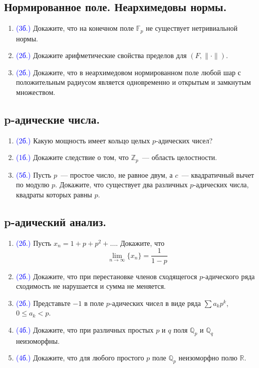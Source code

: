 \documentclass[11pt]{article}
\begin{document}
    \subsection*{Нормированное поле. Неархимедовы нормы.}
    \begin{enumerate}[start=1,label={\bfseries \arabic*.}]
        \item \textcolor{blue}{(3б.)} Докажите, что на конечном поле $\mathbb{F}_{p}$ не существует нетривиальной нормы.

        \item \textcolor{blue}{(2б.)} Докажите арифметические свойства пределов для $(F, \| \cdot \|)$.

        \item \textcolor{blue}{(2б.)} Докажите, что в неархимедовом нормированном поле любой шар с положительным радиусом является одновременно и открытым
              и замкнутым множеством.
    \end{enumerate}
    \subsection*{p-адические числа.}
    \begin{enumerate}[start=1,label={\bfseries \arabic*.}]
        \item \textcolor{blue}{(2б.)} Какую мощность имеет кольцо целых $p$-адических чисел?

        \item \textcolor{blue}{(1б.)} Докажите следствие о том, что $\mathbb{Z}_p$~--- область целостности.

        \item \textcolor{blue}{(5б.)} Пусть $p$~--- простое число, не равное двум, а $c$~--- квадратичный вычет по модулю $p$.
              Докажите, что существует два различных $p$-адических числа, квадраты которых равны $p$.
    \end{enumerate}
    \subsection*{p-адический анализ.}
    \begin{enumerate}[start=1,label={\bfseries \arabic*.}]
        \item \textcolor{blue}{(2б.)} Пусть $x_n = 1 + p + p^2 + \ldots $. Докажите, что
              \[ \lim\limits_{n \to \infty} \{ x_n \} = \frac{1}{1 - p}\]
        \item  \textcolor{blue}{(2б.)} Докажите, что при перестановке членов сходящегося $p$-адического ряда сходимость
               не нарушается и сумма не меняется.
        \item \textcolor{blue}{(2б.)} Представьте $-1$ в поле $p$-адических чисел в виде ряда $\sum a_k p^k$, $0 \le a_k < p$.

        \item \textcolor{blue}{(4б.)} Докажите, что при различных простых  $p$ и $q$ поля $\mathbb{Q}_p$ и $\mathbb{Q}_{q}$ неизоморфны.

        \item \textcolor{blue}{(4б.)} Докажите, что для любого простого $p$ поле $\mathbb{Q}_p$ неизоморфно полю $\mathbb{R}$.
    \end{enumerate}
\end{document}
